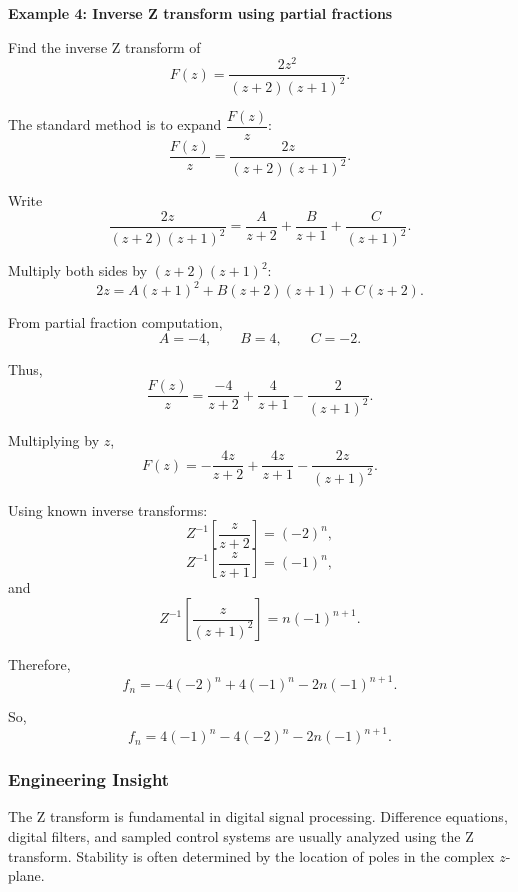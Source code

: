\begin{examplebox}
    \textbf{Example 4: Inverse Z transform using partial fractions}

    Find the inverse Z transform of
    \[
        F(z)=\frac{2z^2}{(z+2)(z+1)^2}.
    \]

    The standard method is to expand $\dfrac{F(z)}{z}$:
    \[
        \frac{F(z)}{z}
        =
        \frac{2z}{(z+2)(z+1)^2}.
    \]

    Write
    \[
        \frac{2z}{(z+2)(z+1)^2}
        =
        \frac{A}{z+2}
        +
        \frac{B}{z+1}
        +
        \frac{C}{(z+1)^2}.
    \]

    Multiply both sides by $(z+2)(z+1)^2$:
    \[
        2z=A(z+1)^2+B(z+2)(z+1)+C(z+2).
    \]

    From partial fraction computation,
    \[
        A=-4,\qquad B=4,\qquad C=-2.
    \]

    Thus,
    \[
        \frac{F(z)}{z}
        =
        \frac{-4}{z+2}
        +
        \frac{4}{z+1}
        -
        \frac{2}{(z+1)^2}.
    \]

    Multiplying by $z$,
    \[
        F(z)
        =
        -\frac{4z}{z+2}
        +
        \frac{4z}{z+1}
        -
        \frac{2z}{(z+1)^2}.
    \]

    Using known inverse transforms:
    \[
        Z^{-1}\left[\frac{z}{z+2}\right]=(-2)^n,
    \]
    \[
        Z^{-1}\left[\frac{z}{z+1}\right]=(-1)^n,
    \]
    and
    \[
        Z^{-1}\left[\frac{z}{(z+1)^2}\right]=n(-1)^{n+1}.
    \]

    Therefore,
    \[
        f_n
        =
        -4(-2)^n
        +
        4(-1)^n
        -
        2n(-1)^{n+1}.
    \]

    So,
    \[
        \boxed{
            f_n=4(-1)^n-4(-2)^n-2n(-1)^{n+1}
        }.
    \]
\end{examplebox}

\subsubsection*{Engineering Insight}

\begin{noteBox}
    The Z transform is fundamental in digital signal processing. Difference equations, digital filters, and sampled control systems are usually analyzed using the Z transform. Stability is often determined by the location of poles in the complex $z$-plane.
\end{noteBox}

